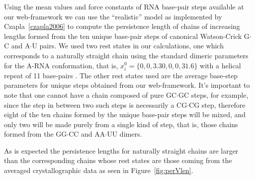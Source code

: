 Using  the mean  values and  force  constants of  RNA base-pair  steps
available at our  web-framework we can use the  ``realistic'' model as
implemented  by  Czapla~\ref{czapla2006}  to compute  the  persistence
length  of chains  of increasing  lengths formed  from the  ten unique
base-pair  steps  of canonical  Watson-Crick  G$\cdot$C and  A$\cdot$U
pairs.   We  used two  rest  states  in  our calculations,  one  which
corresponds to  a naturally straight chain using  the standard dimeric
parameters for  the A-RNA conformation,  that is, $x_{i}^{0} =  \{0, 0,
  3.30,  0,  0,  31.6\}$ with   a  helical  repeat  of  11  base-pairs
\cite{arnott1999}.   The  other  rest  states  used  are  the  average
base-step   parameters   for    unique   steps   obtained   from   our
web-framework. It's  important to  note that one  cannot have  a chain
composed of  pure GC$\cdot$GC  steps, for example,  since the  step in
between two  such steps is  necessarily a CG$\cdot$CG  step, therefore
eight of the  ten chains formed by the unique  base-pair steps will be
mixed, and  only two will be made  purely from a single  kind of step,
that  is, those  chains formed  from the  GG$\cdot$CC  and AA$\cdot$UU
dimers.

As is expected the persistence lengths for naturally straight chains
are larger than the corresponding chains whose rest states are those
coming from the averaged crystallographic data as seen in
Figure~\ref{fig:perVlen}.

